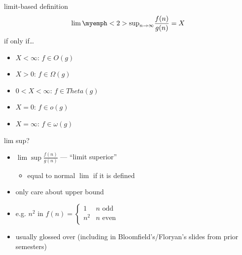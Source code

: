 \begin{frame}{limit-based definition}
\[\lim\myemph<2>{\sup}_{n\to\infty} \frac{f(n)}{g(n)} = X\]
if only if\ldots
\begin{itemize}
\item $X < \infty$: $f\in O(g)$
\item $X > 0$: $f \in \Omega(g)$
\item $0 < X < \infty$: $f \in Theta(g)$
\item $X = 0$: $f \in o(g)$
\item $X = \infty$: $f \in \omega(g)$
\end{itemize}
\end{frame}

\begin{frame}{lim sup?}
\begin{itemize}
\item $\lim\sup \frac{f(n)}{g(n)}$ --- ``limit superior''
    \begin{itemize}
        \item equal to normal $\lim$ if it is defined
    \end{itemize}
\item only care about upper bound
\item e.g. $n^2$ in  $f(n) = \begin{cases} 1 & n \text{ odd} \\n^2 & n \text{ even} \\ \end{cases}$
\vspace{.5cm}
\item usually glossed over (including in Bloomfield's/Floryan's slides from prior semesters)
\end{itemize}
\end{frame}
